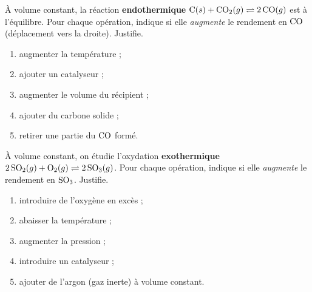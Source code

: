 \documentclass[11pt,a4paper]{article}
\begin{document}
\begin{exo}
À volume constant, la réaction \textbf{endothermique} $\ce{C}(s) + \ce{CO2}(g) \rightleftharpoons 2\,\ce{CO}(g)$ est à l'équilibre. Pour chaque opération, indique si elle \emph{augmente} le rendement en $\ce{CO}$ (déplacement vers la droite). Justifie.
\begin{enumerate}[label=\alph*)]
  \item augmenter la température ;
  \item ajouter un catalyseur ;
  \item augmenter le volume du récipient ;
  \item ajouter du carbone solide ;
  \item retirer une partie du $\ce{CO}$ formé.
\end{enumerate}
\end{exo}

\begin{exo}
À volume constant, on étudie l'oxydation \textbf{exothermique} $2\,\ce{SO2}(g) + \ce{O2}(g) \rightleftharpoons 2\,\ce{SO3}(g)$. Pour chaque opération, indique si elle \emph{augmente} le rendement en $\ce{SO3}$. Justifie.
\begin{enumerate}[label=\alph*)]
  \item introduire de l'oxygène en excès ;
  \item abaisser la température ;
  \item augmenter la pression ;
  \item introduire un catalyseur ;
  \item ajouter de l'argon (gaz inerte) à volume constant.
\end{enumerate}
\end{exo}
\end{document}
